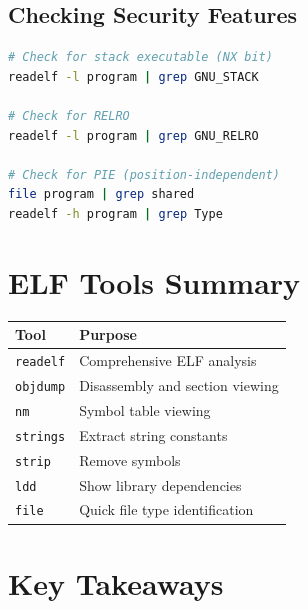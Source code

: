 \subsection{Checking Security Features}

\begin{lstlisting}[language=bash]
# Check for stack executable (NX bit)
readelf -l program | grep GNU_STACK

# Check for RELRO
readelf -l program | grep GNU_RELRO

# Check for PIE (position-independent)
file program | grep shared
readelf -h program | grep Type
\end{lstlisting}

\section{ELF Tools Summary}

\begin{tabular}{|l|l|}
\hline
\textbf{Tool} & \textbf{Purpose} \\
\hline
\texttt{readelf} & Comprehensive ELF analysis \\
\hline
\texttt{objdump} & Disassembly and section viewing \\
\hline
\texttt{nm} & Symbol table viewing \\
\hline
\texttt{strings} & Extract string constants \\
\hline
\texttt{strip} & Remove symbols \\
\hline
\texttt{ldd} & Show library dependencies \\
\hline
\texttt{file} & Quick file type identification \\
\hline
\end{tabular}

\section{Key Takeaways}

